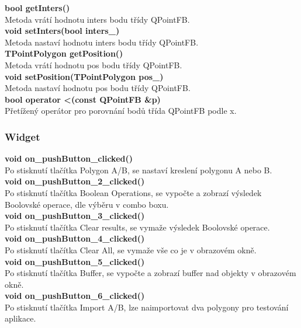 \documentclass[a4paper, 12pt]{article}
\begin{document}
\textbf{bool getInters()}\\
Metoda vrátí hodnotu inters bodu třídy QPointFB.\\

\textbf{void setInters(bool inters\_)}\\
Metoda nastaví hodnotu inters bodu třídy QPointFB.\\

\textbf{TPointPolygon getPosition()}\\
Metoda vrátí hodnotu pos bodu třídy QPointFB.\\

\textbf{void setPosition(TPointPolygon pos\_)}\\
Metoda nastaví hodnotu pos bodu třídy QPointFB.\\

\textbf{bool operator \textless (const QPointFB \&p)}\\
Přetížený operátor pro porovnání bodů třída QPointFB podle x.\\

\subsubsection{Widget}

\textbf{void on\_pushButton\_clicked()}\\
Po stisknutí tlačítka Polygon A/B, se nastaví kreslení polygonu A nebo B.\\

\textbf{void on\_pushButton\_2\_clicked()}\\
Po stisknutí tlačítka Boolean Operations, se vypočte a zobrazí výsledek Boolovské operace, dle výběru v combo boxu.\\

\textbf{void on\_pushButton\_3\_clicked()}\\
Po stisknutí tlačítka Clear results, se vymaže výsledek Boolovské operace.\\

\textbf{void on\_pushButton\_4\_clicked()}\\
Po stisknutí tlačítka Clear All, se vymaže vše co je v obrazovém okně.\\

\textbf{void on\_pushButton\_5\_clicked()}\\
Po stisknutí tlačítka Buffer, se vypočte a zobrazí buffer nad objekty v obrazovém okně.\\

\textbf{void on\_pushButton\_6\_clicked()}\\
Po stisknutí tlačítka Import A/B, lze naimportovat dva polygony pro testování aplikace.\\
\end{document}
